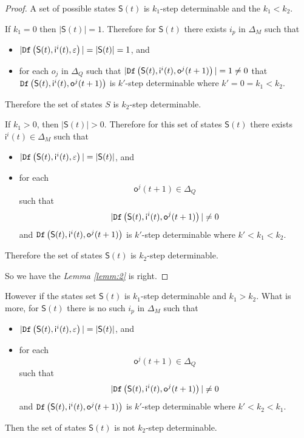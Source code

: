 \begin{proof}
 A set of possible states $\mathsf{S}(t)$ is $k_1$-step determinable and the $k_1< k_2$. 
 
 If $k_1=0$ then $|\mathsf{S}(t)|=1$. Therefore for $\mathsf{S}(t)$ there exists $i_p$ in $\Delta_M$ such that
 \begin{itemize}
 \item  $|{\tt Df}\left(\mathsf{S}(t),\mathsf{i}^{i}(t),\varepsilon\right)|=|\mathsf{S}(t)|=1$, and 
 \item  for each $o_j$ in $\Delta_Q$ such that $|{\tt Df}\left(\mathsf{S}(t),\mathsf{i}^{i}(t),\mathsf{o}^{j}(t+1)\right)|=1\neq 0$ that ${\tt Df}\left(\mathsf{S}(t),\mathsf{i}^{i}(t),\mathsf{o}^{j}(t+1)\right)$ is $k'$-step determinable where ${k'}=0=k_1< k_2$.
 \end{itemize}
 Therefore the set of states $S$ is $k_2$-step determinable.
 
 If $k_1>0$, then $|\mathsf{S}(t)|>0$. Therefore for this set of states $\mathsf{S}(t)$ there exists $\mathsf{i}^{i}(t) \in \Delta_M$ such that
 \begin{itemize}
 \item  $|{\tt Df}\left(\mathsf{S}(t),\mathsf{i}^{i}(t),\varepsilon\right)|=|\mathsf{S}(t)|$, and 
 \item  for each \[\mathsf{o}^{j}(t+1)\in \Delta_Q\] such that \[|{\tt Df}\left(\mathsf{S}(t),\mathsf{i}^{i}(t),\mathsf{o}^{j}(t+1)\right)|\neq 0\] and ${\tt Df}\left(\mathsf{S}(t),\mathsf{i}^{i}(t),\mathsf{o}^{j}(t+1)\right)$ is $k'$-step determinable where ${k'}<k_1< k_2$.
 \end{itemize}
 Therefore the set of states $\mathsf{S}(t)$ is $k_2$-step determinable.

 So we have the {\em Lemma \ref{lemm:2}} is right.
\end{proof}

However if the states set $\mathsf{S}(t)$ is $k_1$-step determinable and $k_1> k_2$. What is more, for $\mathsf{S}(t)$ there is no such $i_p$ in $\Delta_M$ such that
 \begin{itemize}
 \item  $|{\tt Df}\left(\mathsf{S}(t),\mathsf{i}^{i}(t),\varepsilon\right)|=|\mathsf{S}(t)|$, and 
 \item  for each \[\mathsf{o}^{j}(t+1)\in \Delta_Q\] such that \[|{\tt Df}\left(\mathsf{S}(t),\mathsf{i}^{i}(t),\mathsf{o}^{j}(t+1)\right)|\neq 0\] and ${\tt Df}\left(\mathsf{S}(t),\mathsf{i}^{i}(t),\mathsf{o}^{j}(t+1)\right)$ is $k'$-step determinable where ${k'}<k_2<k_1$.
 \end{itemize}
 Then the set of states $\mathsf{S}(t)$ is not $k_2$-step determinable.

